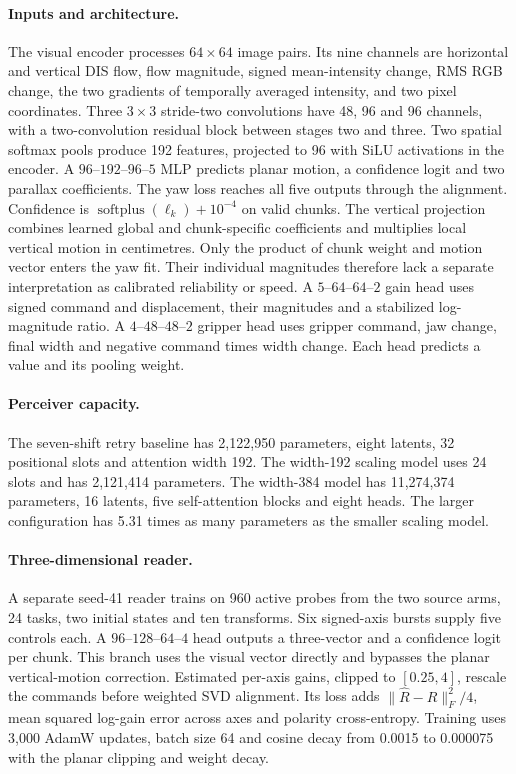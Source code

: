 \documentclass{article}
\theoremstyle{plain}
\theoremstyle{remark}
\begin{document}
\paragraph{Inputs and architecture.} The visual encoder processes $64\times64$ image pairs. Its nine channels are horizontal and vertical DIS flow, flow magnitude, signed mean-intensity change, RMS RGB change, the two gradients of temporally averaged intensity, and two pixel coordinates. Three $3\times3$ stride-two convolutions have 48, 96 and 96 channels, with a two-convolution residual block between stages two and three. Two spatial softmax pools produce 192 features, projected to 96 with SiLU activations in the encoder. A $96$--$192$--$96$--$5$ MLP predicts planar motion, a confidence logit and two parallax coefficients. The yaw loss reaches all five outputs through the alignment. Confidence is $\operatorname{softplus}(\ell_k)+10^{-4}$ on valid chunks. The vertical projection combines learned global and chunk-specific coefficients and multiplies local vertical motion in centimetres. Only the product of chunk weight and motion vector enters the yaw fit. Their individual magnitudes therefore lack a separate interpretation as calibrated reliability or speed. A $5$--$64$--$64$--$2$ gain head uses signed command and displacement, their magnitudes and a stabilized log-magnitude ratio. A $4$--$48$--$48$--$2$ gripper head uses gripper command, jaw change, final width and negative command times width change. Each head predicts a value and its pooling weight.

\paragraph{Perceiver capacity.} The seven-shift retry baseline has 2,122,950 parameters, eight latents, 32 positional slots and attention width 192. The width-192 scaling model uses 24 slots and has 2,121,414 parameters. The width-384 model has 11,274,374 parameters, 16 latents, five self-attention blocks and eight heads. The larger configuration has 5.31 times as many parameters as the smaller scaling model.

\paragraph{Three-dimensional reader.} A separate seed-41 reader trains on 960 active probes from the two source arms, 24 tasks, two initial states and ten transforms. Six signed-axis bursts supply five controls each. A $96$--$128$--$64$--$4$ head outputs a three-vector and a confidence logit per chunk. This branch uses the visual vector directly and bypasses the planar vertical-motion correction. Estimated per-axis gains, clipped to $[0.25,4]$, rescale the commands before weighted SVD alignment. Its loss adds $\|\hat R-R\|_F^2/4$, mean squared log-gain error across axes and polarity cross-entropy. Training uses 3,000 AdamW updates, batch size 64 and cosine decay from 0.0015 to 0.000075 with the planar clipping and weight decay.
\end{document}
